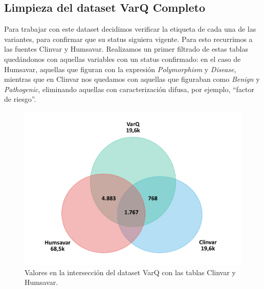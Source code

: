 \subsection{Limpieza del dataset VarQ Completo}

Para trabajar con este dataset decidimos verificar la etiqueta de cada una de las variantes, para confirmar que su status siguiera vigente. Para esto recurrimos a las fuentes Clinvar y Humsavar. Realizamos un primer filtrado de estas tablas quedándonos con aquellas variables con un status confirmado: en el caso de Humsavar, aquellas que figuran con la expresión \textit{Polymorphism} y \textit{Disease}, mientras que en Clinvar nos quedamos con aquellas que figuraban como \textit{Benign} y \textit{Pathogenic}, eliminando aquellas con caracterización difusa, por ejemplo, ``factor de riesgo''. 

\begin{figure}[H]
    \centering
    \includegraphics[scale=0.4]{documents/latex/figures/3/interseccion_varq.pdf}
    \caption{Valores en la intersección del dataset VarQ con las tablas Clinvar y Humsavar.}
    \label{fig:interseccion_varq}
\end{figure}

